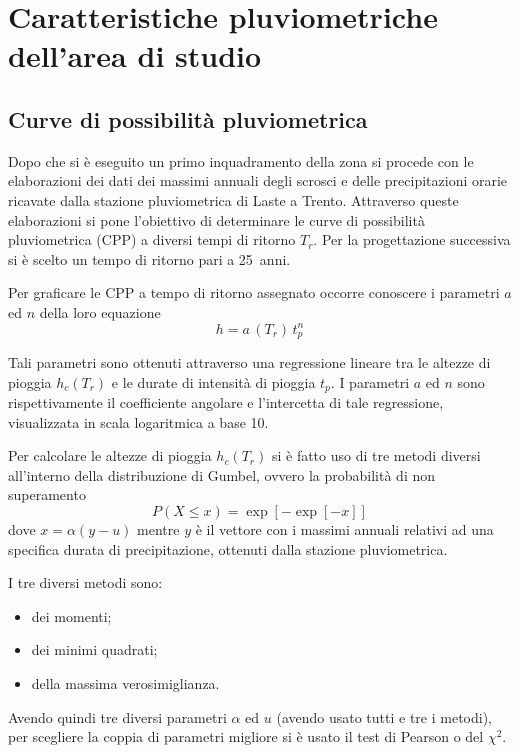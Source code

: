 \chapter{Caratteristiche pluviometriche dell’area di studio}\label{cap:pluviometriche}
\section{Curve di possibilità pluviometrica}
Dopo che si è eseguito un primo inquadramento della zona si procede con le elaborazioni dei dati dei massimi annuali degli scrosci e delle precipitazioni orarie ricavate dalla stazione pluviometrica di Laste a Trento.
Attraverso queste elaborazioni si pone l'obiettivo di determinare le curve di possibilità pluviometrica (CPP) a diversi tempi di ritorno $T_r$.
Per la progettazione successiva si è scelto un tempo di ritorno pari a \SI{25}{anni}. 

Per graficare le CPP a tempo di ritorno assegnato occorre conoscere i parametri $a$ ed $n$ della loro equazione
\begin{equation}
    \label{eq:CPP}
    h = a\,(T_r) \, t_p ^{n}
\end{equation}

Tali parametri sono ottenuti attraverso una regressione lineare tra le altezze di pioggia $h_c (T_r)$ e le durate di intensità di pioggia $t_p$. 
I parametri $a$ ed $n$ sono rispettivamente il coefficiente angolare e l'intercetta di tale regressione, visualizzata in scala logaritmica a base 10. 

Per calcolare le altezze di pioggia $h_c (T_r)$ si è fatto uso di tre metodi diversi all'interno della distribuzione di Gumbel, ovvero la probabilità di non superamento 
\begin{equation}
  P(X\leq x) = \exp{\left[-\exp{\left[-x \right]} \right]}
\end{equation}
 dove $x = \alpha ( y - u)$ mentre $y$ è il vettore con i massimi annuali relativi ad una specifica durata di precipitazione, ottenuti dalla stazione pluviometrica.

I tre diversi metodi sono:
\begin{itemize}
\item dei momenti;
\item dei minimi quadrati;
\item della massima verosimiglianza.
\end{itemize}
Avendo quindi tre diversi parametri $\alpha$ ed $u$ (avendo usato tutti e tre i metodi), per scegliere la coppia di parametri migliore si è usato il test di Pearson o del $\chi ^2$.


